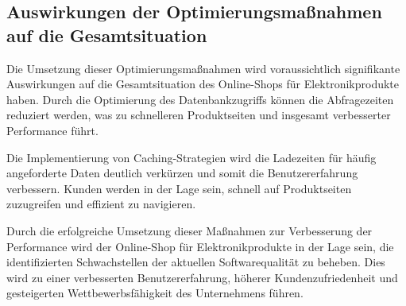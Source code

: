 \subsection{Auswirkungen der Optimierungsmaßnahmen auf die Gesamtsituation}
Die Umsetzung dieser Optimierungsmaßnahmen wird voraussichtlich signifikante Auswirkungen auf die Gesamtsituation des Online-Shops für Elektronikprodukte haben. Durch die Optimierung des Datenbankzugriffs können die Abfragezeiten reduziert werden, was zu schnelleren Produktseiten und insgesamt verbesserter Performance führt.

Die Implementierung von Caching-Strategien wird die Ladezeiten für häufig angeforderte Daten deutlich verkürzen und somit die Benutzererfahrung verbessern. Kunden werden in der Lage sein, schnell auf Produktseiten zuzugreifen und effizient zu navigieren.

Durch die erfolgreiche Umsetzung dieser Maßnahmen zur Verbesserung der Performance wird der Online-Shop für Elektronikprodukte in der Lage sein, die identifizierten Schwachstellen der aktuellen Softwarequalität zu beheben. Dies wird zu einer verbesserten Benutzererfahrung, höherer Kundenzufriedenheit und gesteigerten Wettbewerbsfähigkeit des Unternehmens führen.
